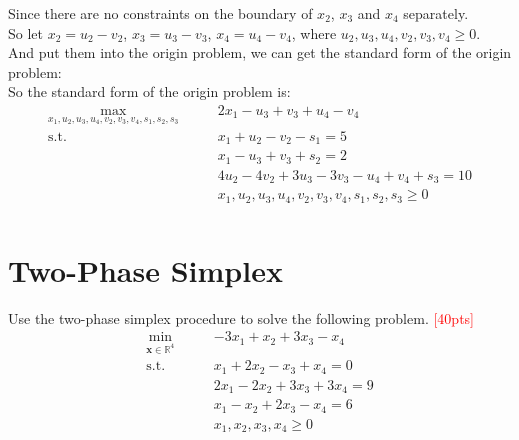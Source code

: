 \documentclass[10pt]{article}
\begin{document}
Since there are no constraints on the boundary of $x_2$, $x_3$ and $x_4$ separately.\\
So let $x_2 = u_2 - v_2$, $x_3 = u_3 - v_3$, $x_4 = u_4 - v_4$, where $u_2,u_3,u_4,v_2,v_3,v_4\geq 0$.\\
And put them into the origin problem, we can get the standard form of the origin problem:\\

So the standard form of the origin problem is:\\
\begin{equation}
	\begin{aligned}
		\max_{x_1,u_2,u_3,u_4,v_2,v_3,v_4,s_1,s_2,s_3}\qquad & 2x_1 - u_3 + v_3 + u_4 - v_4 \\
		\mathrm{s.t.}\qquad & x_{1} + u_2 - v_2 - s_1 = 5 \\
							& x_{1} - u_3 + v_3 + s_2 = 2 \\
							& 4u_2 - 4v_2 + 3u_3 - 3v_3 - u_4 + v_4 + s_3 = 10 \\
							& x_1,u_2,u_3,u_4,v_2,v_3,v_4,s_1,s_2,s_3 \geq 0 \\
	\end{aligned}
\end{equation}

\newpage

\section{Two-Phase Simplex}
Use the two-phase simplex procedure to solve the following problem. \textcolor{red}{[40pts]}
\begin{equation}
	\begin{aligned}
		\min_{\bm{x} \in \mathbb{R}^{4}}\qquad & -3x_{1} + x_{2} + 3x_{3} - x_{4} \\
		\mathrm{s.t.}\qquad & x_{1} + 2x_{2} - x_{3} + x_{4} = 0 \\
							  & 2x_{1} - 2x_{2} + 3x_{3} + 3x_{4} = 9 \\
							  & x_{1} - x_{2} + 2x_{3} - x_{4} = 6 \\
							  & x_{1}, x_{2}, x_{3}, x_{4} \geq 0 \\
	\end{aligned}
\end{equation}
\end{document}
